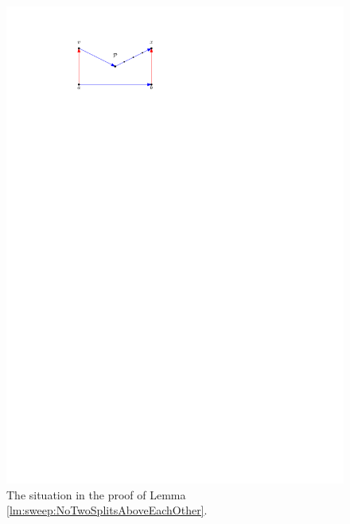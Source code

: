     \quad
    \quad
    \begin{figure}[h]
      \centering
      \includegraphics[scale=1]{unifiedAlgo/img/sweep/bottompathChord.pdf}
      \caption{The situation in the proof of Lemma \ref{lm:sweep:NoTwoSplitsAboveEachOther}.}
      \label{fig:sweep:botomPathChord}
    \end{figure}
